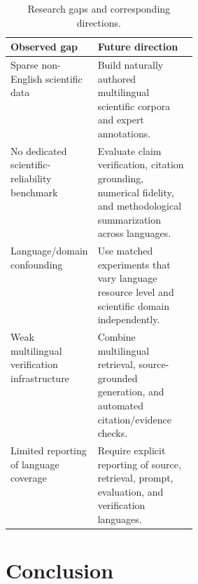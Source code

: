 \documentclass[acmsmall,screen,review]{acmart}
\begin{document}
\begin{table}[t]

\caption{Research gaps and corresponding directions.}

\label{tab:research-gaps}

\centering

\small

\begin{tabularx}{\linewidth}
{@{}p{0.31\linewidth}X@{}}

\toprule

\textbf{Observed gap}
&
\textbf{Future direction}
\\

\midrule

Sparse non-English scientific data
&
Build naturally authored multilingual scientific corpora and expert annotations.
\\

No dedicated scientific-reliability benchmark
&
Evaluate claim verification, citation grounding, numerical fidelity, and methodological summarization across languages.
\\

Language/domain confounding
&
Use matched experiments that vary language resource level and scientific domain independently.
\\

Weak multilingual verification infrastructure
&
Combine multilingual retrieval, source-grounded generation, and automated citation/evidence checks.
\\

Limited reporting of language coverage
&
Require explicit reporting of source, retrieval, prompt, evaluation, and verification languages.
\\

\bottomrule

\end{tabularx}

\end{table}


\section{Conclusion}
\label{sec:conclusion}
\end{document}
